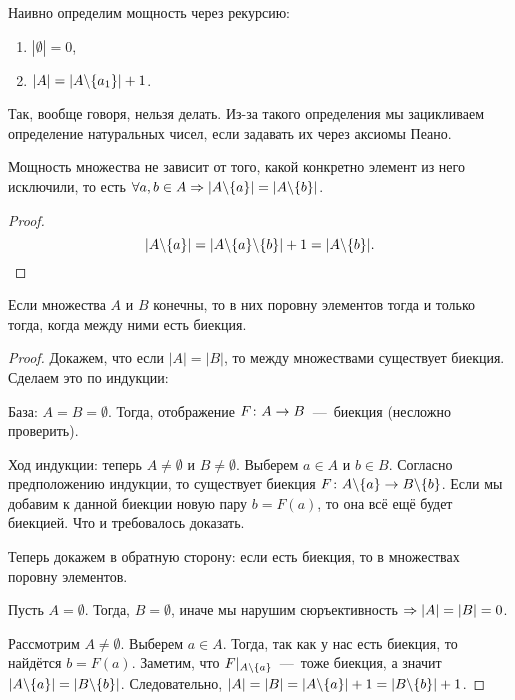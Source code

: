 \begin{definition}
	Наивно определим мощность через рекурсию:
	\begin{enumerate}
		\item $|\emptyset| = 0$,
		\item $|A| = |A \backslash \{a_1\}| + 1$.
	\end{enumerate}
\end{definition}

\begin{note}
	Так, вообще говоря, нельзя делать. Из-за такого определения мы зацикливаем определение натуральных чисел, если задавать их через аксиомы Пеано.
\end{note}

\begin{theorem}
	Мощность множества не зависит от того, какой конкретно элемент из него исключили, то есть $\forall a, b \in A \Rightarrow |A \backslash \{a\}| = |A \backslash \{b\}|$.
\end{theorem}

\begin{proof}
	$$
		|A \backslash \{a\}| = |A \backslash \{a\} \backslash \{b\}| + 1 = |A \backslash \{b\}|.
	$$
\end{proof}

\begin{theorem}
	Если множества $A$ и $B$ конечны, то в них поровну элементов тогда и только тогда, когда между ними есть биекция.
\end{theorem}

\begin{proof}
	Докажем, что если $|A| = |B|$, то между множествами существует биекция. Сделаем это по индукции:
	
	База: $A = B = \emptyset$. Тогда, отображение $F \colon A \rightarrow B$~---~биекция (несложно проверить).
	
	Ход индукции: теперь $A \neq \emptyset$ и $B \neq \emptyset$. Выберем $a \in A$ и $b \in B$. Согласно предположению индукции, то существует биекция $F \colon A \backslash \{a\} \rightarrow B \backslash \{b\}$. Если мы добавим к данной биекции новую пару $b = F(a)$, то она всё ещё будет биекцией. Что и требовалось доказать.
	
	Теперь докажем в обратную сторону: если есть биекция, то в множествах поровну элементов.
	
	Пусть $A = \emptyset$. Тогда, $B = \emptyset$, иначе мы нарушим сюръективность $\Rightarrow |A| = |B| = 0$.
	
	Рассмотрим $A \neq \emptyset$. Выберем $a \in A$. Тогда, так как у нас есть биекция, то найдётся $b = F(a)$. Заметим, что $F|_{A \backslash \{a\}}$~---~тоже биекция, а значит $|A \backslash \{a\}| = |B \backslash \{b\}|$. Следовательно, $|A| = |B| = |A \backslash \{a\}| + 1 = |B \backslash \{b\}| + 1$.
\end{proof}

